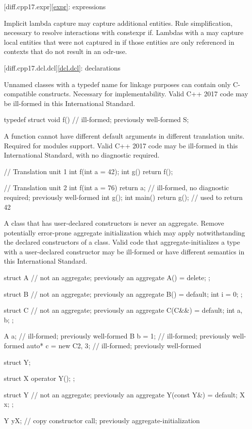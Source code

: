 [diff.cpp17.expr]{\ref{expr}: expressions}

\change
Implicit lambda capture may capture additional entities.
\rationale
Rule simplification, necessary to resolve interactions with constexpr if.
\effect
Lambdas with a 
may capture local entities
that were not captured in \CppXVII{}
if those entities are only referenced in contexts
that do not result in an odr-use.

[diff.cpp17.dcl.dcl]{\ref{dcl.dcl}: declarations}

\change
Unnamed classes with a typedef name for linkage purposes
can contain only C-compatible constructs.
\rationale
Necessary for implementability.
\effect
Valid C++ 2017 code may be ill-formed in this International Standard.
\begin{codeblock}
typedef struct {
  void f() {}           // ill-formed; previously well-formed
} S;
\end{codeblock}

\change
A function cannot have different default arguments
in different translation units.
\rationale
Required for modules support.
\effect
Valid C++ 2017 code may be ill-formed in this International Standard,
with no diagnostic required.
\begin{codeblock}
// Translation unit 1
int f(int a = 42);
int g() { return f(); }

// Translation unit 2
int f(int a = 76) { return a; }         // ill-formed, no diagnostic required; previously well-formed
int g();
int main() { return g(); }              // used to return 42
\end{codeblock}

\change
A class that has user-declared constructors is never an aggregate.
\rationale
Remove potentially error-prone aggregate initialization
which may apply notwithstanding the declared constructors of a class.
\effect
Valid \CppXVII{} code that aggregate-initializes
a type with a user-declared constructor
may be ill-formed or have different semantics
in this International Standard.
\begin{codeblock}
struct A {              // not an aggregate; previously an aggregate
  A() = delete;
};

struct B {              // not an aggregate; previously an aggregate
  B() = default;
  int i = 0;
};

struct C {              // not an aggregate; previously an aggregate
  C(C&&) = default;
  int a, b;
};

A a{};                  // ill-formed; previously well-formed
B b = {1};              // ill-formed; previously well-formed
auto* c = new C{2, 3};  // ill-formed; previously well-formed

struct Y;

struct X {
  operator Y();
};

struct Y {              // not an aggregate; previously an aggregate
  Y(const Y&) = default;
  X x;
};

Y y{X{}};               // copy constructor call; previously aggregate-initialization
\end{codeblock}

